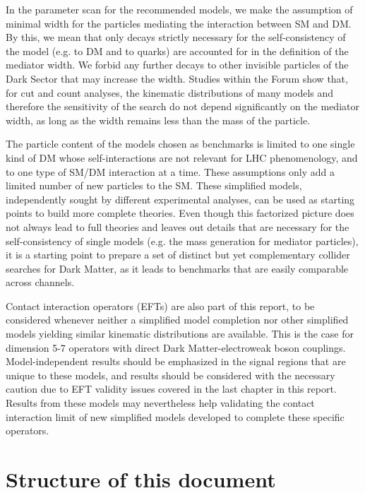 In the parameter scan for the recommended models, we make the
assumption of minimal width for the particles mediating the
interaction between SM and DM.  By this, we mean that only decays
strictly necessary for the self-consistency of the model (e.g.  to DM
and to quarks) are accounted for in the definition of the mediator
width. We forbid any further decays to other invisible particles of
the Dark Sector that may increase the width. Studies within the Forum
show that, for cut and count analyses, the kinematic distributions of
many models and therefore the sensitivity of the search do not depend
significantly on the mediator width, as long as the width remains less
than the mass of the particle.

The particle content of the models chosen as benchmarks is limited to
one single kind of DM whose self-interactions are not relevant for LHC
phenomenology, and to one type of SM/DM interaction at a time. These
assumptions only add a limited number of new particles to the
SM. These simplified models, independently sought by different
experimental analyses, can be used as starting points to build more
complete theories. Even though this factorized picture does not always
lead to full theories and leaves out details that are necessary for
the self-consistency of single models (e.g. the mass generation for
mediator particles), it is a starting point to prepare a set of
distinct but yet complementary collider searches for Dark Matter, as
it leads to benchmarks that are easily comparable across channels.

Contact interaction operators (EFTs) are also part of this report, 
to be considered whenever neither a simplified model completion nor other simplified models 
yielding similar kinematic distributions are available. 
This is the case for dimension 5-7 operators with direct 
Dark Matter-electroweak boson couplings. 
Model-independent results should be emphasized 
in the signal regions that are unique to these models, 
and results should be considered with the necessary caution due to EFT 
validity issues covered in the last chapter in this report. 
Results from these models may nevertheless help validating the 
contact interaction limit of new simplified models developed to complete 
these specific operators. 

\section{Structure of this document}

